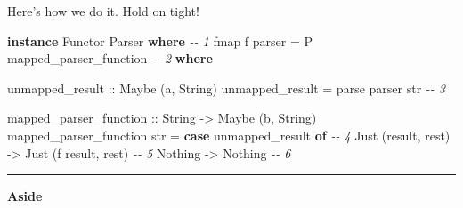 \documentclass[]{article}
\newenvironment{Shaded}{}{}
\newcommand{\CommentTok}[1]{\textcolor[rgb]{0.38,0.63,0.69}{\textit{#1}}}
\newcommand{\DataTypeTok}[1]{\textcolor[rgb]{0.56,0.13,0.00}{#1}}
\newcommand{\FunctionTok}[1]{\textcolor[rgb]{0.02,0.16,0.49}{#1}}
\newcommand{\KeywordTok}[1]{\textcolor[rgb]{0.00,0.44,0.13}{\textbf{#1}}}
\newcommand{\NormalTok}[1]{#1}
\newcommand{\OtherTok}[1]{\textcolor[rgb]{0.00,0.44,0.13}{#1}}
\begin{document}
Here's how we do it. Hold on tight!

\begin{Shaded}
\begin{Highlighting}[]
\KeywordTok{instance} \DataTypeTok{Functor} \DataTypeTok{Parser} \KeywordTok{where}                                       \CommentTok{{-}{-} 1}
    \FunctionTok{fmap}\NormalTok{ f parser }\OtherTok{=} \DataTypeTok{P}\NormalTok{ mapped\_parser\_function                        }\CommentTok{{-}{-} 2}
        \KeywordTok{where}

\OtherTok{            unmapped\_result ::} \DataTypeTok{Maybe}\NormalTok{ (a, }\DataTypeTok{String}\NormalTok{)}
\NormalTok{            unmapped\_result }\OtherTok{=}\NormalTok{ parse parser str                      }\CommentTok{{-}{-} 3}

\OtherTok{            mapped\_parser\_function ::} \DataTypeTok{String} \OtherTok{{-}\textgreater{}} \DataTypeTok{Maybe}\NormalTok{ (b, }\DataTypeTok{String}\NormalTok{)}
\NormalTok{            mapped\_parser\_function str }\OtherTok{=}
                \KeywordTok{case}\NormalTok{ unmapped\_result }\KeywordTok{of}                             \CommentTok{{-}{-} 4}
                    \DataTypeTok{Just}\NormalTok{ (result, rest) }\OtherTok{{-}\textgreater{}} \DataTypeTok{Just}\NormalTok{ (f result, rest)    }\CommentTok{{-}{-} 5}
                    \DataTypeTok{Nothing}             \OtherTok{{-}\textgreater{}} \DataTypeTok{Nothing}                  \CommentTok{{-}{-} 6}
\end{Highlighting}
\end{Shaded}

\begin{center}\rule{0.5\linewidth}{0.5pt}\end{center}

\textbf{Aside}
\end{document}
